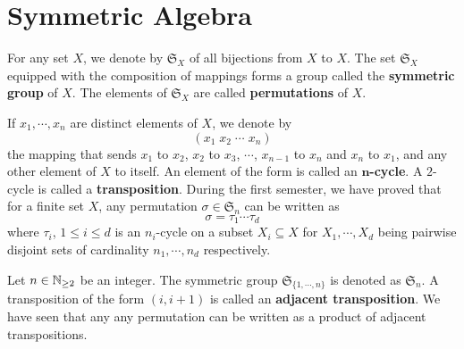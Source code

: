 \section{Symmetric Algebra}

\begin{definitionenv}
    For any set $X$, we denote by $\mathfrak{S}_X$ of all bijections from $X$ to $X$.
    The set $\mathfrak{S}_X$ equipped with the composition of mappings forms a group called the \textbf{symmetric group} of $X$.
    The elements of $\mathfrak{S}_X$ are called \textbf{permutations} of $X$.

    \quad If $x_1,\cdots,x_n$ are distinct elements of $X$, we denote by
    $$ (x_1\; x_2\; \cdots\; x_n)$$
    the mapping that sends $x_1$ to $x_2$, $x_2$ to $x_3$, $\cdots$, $x_{n-1}$ to $x_n$ and $x_n$ to $x_1$, and any other element of $X$ to itself.
    An element of the form is called an \textbf{$\bm{n}$-cycle}. 
    A $2$-cycle is called a \textbf{transposition}.
    During the first semester, we have proved that for a finite set $X$, any permutation $\sigma \in \mathfrak{S}_n$ can be written as
    $$ \sigma = \tau_1 \cdots \tau_d$$
    where $\tau_i$, $1\le i\le d$ is an $n_i$-cycle on a subset $X_i \subseteq X$ for $X_1,\cdots,X_d$ being pairwise disjoint sets of cardinality $n_1,\cdots,n_d$ respectively.
\end{definitionenv}

\begin{remark}
    Let $n\in \mathbb{N}_{\ge 2}$ be an integer.
    The symmetric group $\mathfrak{S}_{\{1,\cdots,n\}}$ is denoted as $\mathfrak{S}_{n}$.
    A transposition of the form $(i,i+1)$ is called an \textbf{adjacent transposition}.
    We have seen that any any permutation can be written as a product of adjacent transpositions.
\end{remark}

